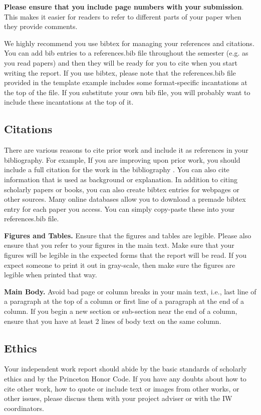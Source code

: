 \documentclass[pageno]{jpaper}
\begin{document}
\textbf{Please ensure that you include page numbers with your
submission}. This makes it easier for readers to refer to
different parts of your paper when they provide comments.

We highly recommend you use bibtex for managing your references and citations.  You can add bib entries to a references.bib file throughout the semester (e.g. as you read papers) and then they will be ready for you to cite when you start writing the report.  If you use bibtex, please note that the references.bib file provided in the template example includes some format-specific incantations at the top of the file.  If you substitute your own bib file, you will probably want to include these 
incantations at the top of it.

\subsection{Citations}

There are various reasons to cite prior work and include it as references in your bibliography.  For example, If you are improving upon 
prior work, you should include
a full citation for the work in the bibliography \cite{nicepaper,nicepaper2}. 
You can also cite information that is used as background or explanation.  In addition to citing scholarly papers or books, you can also create bibtex entries for webpages or other sources.  Many online databases allow you to download a premade bibtex entry for each paper you access.  You can simply copy-paste these into your references.bib file.

\noindent\textbf{Figures and Tables.} Ensure that the figures and
tables are legible.  Please also ensure that you refer to your
figures in the main text. Make sure that your figures will be legible
in the expected forms that the report will be read.  If you expect someone
to print it out in gray-scale, then make sure the figures are legible 
when printed that way.  

\noindent\textbf{Main Body.} Avoid bad page or column breaks in
your main text, i.e., last line of a paragraph at the top of a
column or first line of a paragraph at the end of a column. If you
begin a new section or sub-section near the end of a column,
ensure that you have at least 2 lines of body text on the same
column. 

\subsection{Ethics}

Your independent work report should abide by the basic standards of scholarly ethics and by the Princeton Honor Code. If you have any doubts about how to cite
other work, how to quote or include text or images from other works, or other issues, please discuss them with your project adviser or with the IW coordinators. 


\end{document}
